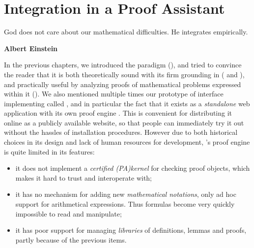 \setchapterpreamble[u]{\margintoc}
\chapter{Integration in a Proof Assistant}

\epigraph{God does not care about our mathematical difficulties. He integrates
empirically.}{\textbf{Albert Einstein}}

In the previous chapters, we introduced the  paradigm
(), and tried to convince the reader that it is both theoretically
sound with its firm grounding in  
( and ), and practically useful by analyzing
proofs of mathematical problems expressed within it (). We also
mentioned multiple times our prototype of interface implementing  called
, and in particular the fact that it exists as a \emph{standalone}
web application with its own proof engine \cite{Actema:link}. This is
convenient for distributing it online as a publicly available website, so that
people can immediately try it out without the hassles of installation
procedures. However due to both historical choices in its design and lack of
human resources for development, 's proof engine is quite limited in
its features:
\begin{itemize}
  \itemAP it can only handle  expressed in many-sorted
     (), whereas all
    state-of-the-art  support \emph{} logic in one form
    or another; and  features are crucial for formalizing many
    mathematical notions in a concise way, as witnessed by the example of
    ;
  \item it does not implement a \emph{certified \kl(PA){kernel}} for checking
    proof objects, which makes it hard to trust and interoperate with;
  \item it has no mechanism for adding new \emph{mathematical notations}, only
    ad hoc support for arithmetical expressions. Thus formulas become very
    quickly impossible to read and manipulate;
  \item it has poor support for managing \emph{libraries} of definitions, lemmas
    and proofs, partly because of the previous items.
\end{itemize}

